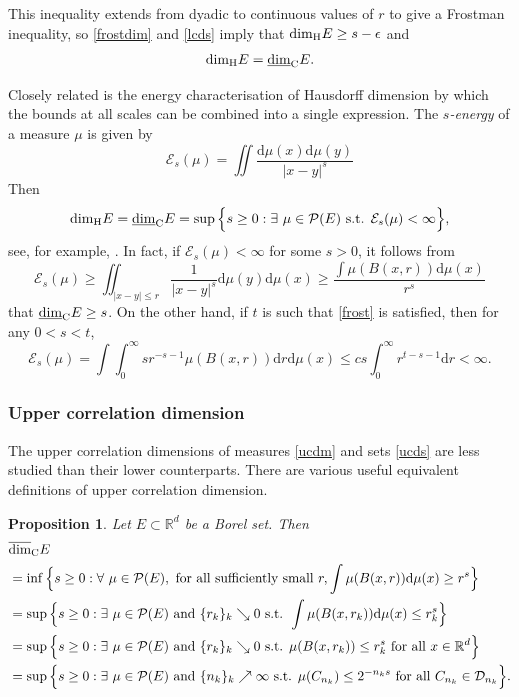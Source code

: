 \documentclass[12pt]{article}
\newcommand{\1}{{\bf 1}}
\newcommand{\D}{\mathcal{D}}
\newcommand\ucod{\overline{\mbox{\rm dim}}_{\rm C}} %
\newcommand\lcod{\underline{\mbox{\rm dim}}_{\rm C}} %
\newcommand\hdd{\mbox{\rm dim}_{\rm H}} %
\newtheorem{prop}[theo]{Proposition}
\begin{document}
This  inequality extends from dyadic to continuous values of $r$ to give a Frostman inequality, so \eqref{frostdim} and \eqref{lcds}  imply that $\hdd E \geq s-\epsilon$ and 
\begin{equation}\label{haucor}
 \hdd E = \lcod E.
 \end{equation}



Closely related is the energy characterisation of Hausdorff dimension by which the bounds at all scales can be combined into a single expression. 
The {\it $s$-energy } of a measure $\mu$ is given by 
\begin{equation}\label{energy}
 	\mathcal{E}_s(\mu)=\iint\frac{\mathrm{d}\mu(x)\mathrm{d}\mu(y)}{|x-y|^{s}}
 \end{equation}
Then
$$ \hdd E = \lcod E = \sup\Big\{ s\geq0: \exists\  \mu\in \mathcal{P}(E)\text{ s.t. }\mathcal{E}_s(\mu)<\infty\Big\},$$ 
see, for example, \cite{FaBk,Mat}.
	In fact,  if $ \mathcal{E}_s(\mu)<\infty$ for some $s>0$, it follows from 
	\begin{equation*}
		\mathcal{E}_s(\mu)\geq\iint_{|x-y|\leq r}\frac{1}{|x-y|^{s}}\mathrm{d}\mu(y)\mathrm{d}\mu(x)\geq \frac{\int\mu(B(x,r))\mathrm{d}\mu(x)}{r^s}
	\end{equation*}
	that $\lcod E\geq s$. On the other hand, if $t$ is such that \eqref{frost} is satisfied, then for any $0<s<t$,
	\begin{equation*}
		\mathcal{E}_s(\mu)=\int\int_0^\infty  sr^{-s-1}\mu(B(x,r))\mathrm{d}r\mathrm{d}\mu(x)
		\leq cs\int_0^\infty  r^{t-s-1}\mathrm{d}r<\infty.
	\end{equation*}
	

\subsubsection{Upper correlation dimension}
The upper correlation dimensions of measures \eqref{ucdm} and sets \eqref{ucds} are less studied than their lower counterparts. There are various useful equivalent definitions of upper correlation dimension.
\begin{prop}\label{cordim}
Let $E \subset \mathbb{R}^d$ be a Borel set. Then
\begin{align}
&\ucod E\nonumber\\
&= \inf\Big\{s \geq 0:  \forall\ \mu \in {\mathcal P}(E), \text{ for all sufficiently small }r, \int \mu(B(x,r))\mathrm{d}\mu(x) \geq r^{s } \Big\} \label{cd1}\\
&= \sup\Big\{s \geq 0: \exists\ \mu \in {\mathcal P}(E)  \text{ and $\{r_k\}_k\searrow 0 $ s.t.  } \int \mu(B(x,r_k))\mathrm{d}\mu(x) \leq r_k^{s } \Big\} \label{cd2} \\
&= \sup\Big\{s \geq 0: \exists\   \mu \in {\mathcal P}(E)  \text{ and $\{r_k\}_k\searrow 0 $ s.t.  } \mu(B(x,r_k))\leq r_k^{s } \text{ for all } x \in \mathbb{R}^d\Big\}\label{cd3}\\
&= \sup\Big\{s \geq 0: \exists\   \mu \in {\mathcal P}(E)  \text{ and $\{n_k\}_k\nearrow\infty $ s.t.  } \mu(C_{n_k})\leq 2^{-n_ks}  \text{ for all } C_{n_k}  \in \D_{n_k}\Big\}\label{cd4}.
\end{align}
\end{prop}
\end{document}
